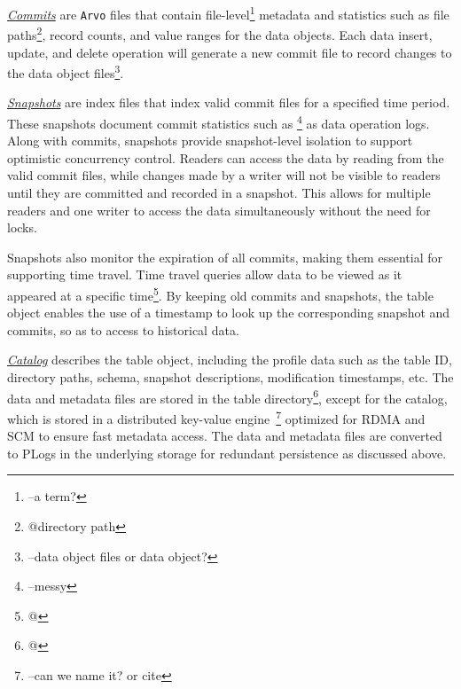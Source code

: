  \noindent \underline{\textit{Commits}} are \texttt{Arvo} files that contain file-level\footnote{--a term?} metadata and statistics such as file paths\footnote{@directory path}, record counts, and value ranges for the data objects. Each data insert, update, and delete operation will generate a new commit file to record changes to the data object files\footnote{--data object files or data object?}.


\noindent \underline{\textit{Snapshots}} are index files that index  valid commit files for a specified time period. These snapshots document commit statistics such as \footnote{--messy} as data operation logs. Along with commits, snapshots provide snapshot-level isolation to support optimistic concurrency control. Readers can access the data by reading from the valid commit files, while changes made by a writer will not be visible to readers until they are committed and recorded in a snapshot. This allows for multiple readers and one writer to access the data simultaneously without the need for locks. 

Snapshots also monitor the expiration of all commits, making them essential for supporting time travel. Time travel queries allow data to be viewed as it appeared at a specific time\footnote{@}. By keeping old commits and snapshots, the table object enables the use of a timestamp to look up the corresponding snapshot and commits, so as to access to historical data.

\noindent \underline{\textit{Catalog}}  describes the table object, including the profile data  such as the table ID, directory paths, schema, snapshot descriptions, modification timestamps, etc. The data and metadata files are stored in the table directory\footnote{@}, except for the catalog, which is stored in a distributed key-value engine~\footnote{--can we name it? or cite} optimized for RDMA and SCM to ensure fast metadata access. The data and metadata files are converted to PLogs in the underlying storage for redundant persistence as discussed above.






















